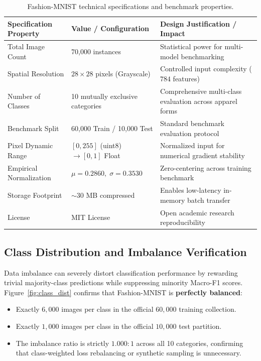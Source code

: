 \documentclass[11pt, a4paper]{article}
\begin{document}
\begin{table}[H]
  \centering
  \caption{Fashion-MNIST technical specifications and benchmark properties.}
  \label{tab:dataset_specs}
  \small
  \begin{tabularx}{\textwidth}{@{}p{3.8cm} p{4.2cm} X@{}}
    \toprule
    \textbf{Specification Property} & \textbf{Value / Configuration} & \textbf{Design Justification / Impact} \\
    \midrule
    Total Image Count & 70,000 instances & Statistical power for multi-model benchmarking \\
    Spatial Resolution & $28 \times 28$ pixels (Grayscale) & Controlled input complexity ($784$ features) \\
    Number of Classes & 10 mutually exclusive categories & Comprehensive multi-class evaluation across apparel forms \\
    Benchmark Split & 60,000 Train / 10,000 Test & Standard benchmark evaluation protocol \\
    Pixel Dynamic Range & $[0, 255]$ (uint8) $\to [0, 1]$ Float & Normalized input for numerical gradient stability \\
    Empirical Normalization & $\mu = 0.2860, \; \sigma = 0.3530$ & Zero-centering across training benchmark \\
    Storage Footprint & $\sim 30$ MB compressed & Enables low-latency in-memory batch transfer \\
    License & MIT License & Open academic research reproducibility \\
    \bottomrule
  \end{tabularx}
\end{table}

\subsection{Class Distribution and Imbalance Verification}
Data imbalance can severely distort classification performance by rewarding trivial majority-class predictions while suppressing minority Macro-F1 scores. Figure~\ref{fig:class_dist} confirms that Fashion-MNIST is \textbf{perfectly balanced}:
\begin{itemize}[noitemsep]
  \item Exactly $6{,}000$ images per class in the official $60{,}000$ training collection.
  \item Exactly $1{,}000$ images per class in the official $10{,}000$ test partition.
  \item The imbalance ratio is strictly $1.000:1$ across all 10 categories, confirming that class-weighted loss rebalancing or synthetic sampling is unnecessary.
\end{itemize}
\end{document}
